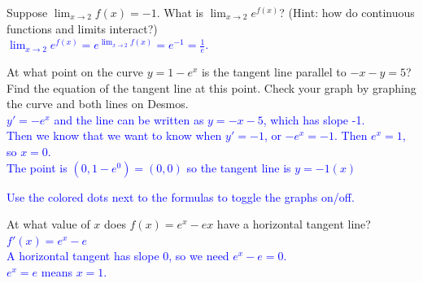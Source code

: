 \documentclass{ximera}
\begin{document}
\begin{exercise}
    Suppose $\displaystyle \lim_{x\rightarrow 2} f(x)=-1$. 
    What is $\displaystyle \lim_{x\rightarrow 2}e^{f(x)}$? (Hint: how do continuous functions and limits interact?)\\
    \textcolor{blue}{ $\lim_{x\rightarrow 2} e^{f(x)}=e^{\lim_{x\rightarrow 2} f(x)}=e^{-1}=\frac1e$.}
\end{exercise}


\begin{exercise}
    At what point on the curve $y=1-e^x$ is the tangent line parallel to $-x-y=5$?   Find the equation of the tangent line at this point.  Check your graph by graphing the curve and both lines on Desmos.\\
     \textcolor{blue}{$y'=-e^x$ and the line can be written as $y=-x-5$, which has slope -1.  \\
    Then we know that we want to know when $y'=-1$, or $-e^x=-1$.  Then $e^x=1$, so $x=0$.  \\
    The point is $(0, 1-e^0)=(0,0)$ so the tangent line is $y=-1(x)$}
    \begin{center}
    \end{center}
    \textcolor{blue}{Use the colored dots next to the formulas to toggle the graphs on/off.}
\end{exercise} 

\begin{exercise}
    At what value of $x$ does $f(x)=e^x-ex$ have a horizontal tangent line? \\
    \textcolor{blue}{ $f'(x)=e^x-e$\\
    A horizontal tangent has slope 0, so we need $e^x-e=0$.\\
    $e^x=e$ means $x=1$.}
\end{exercise}
\end{document}

